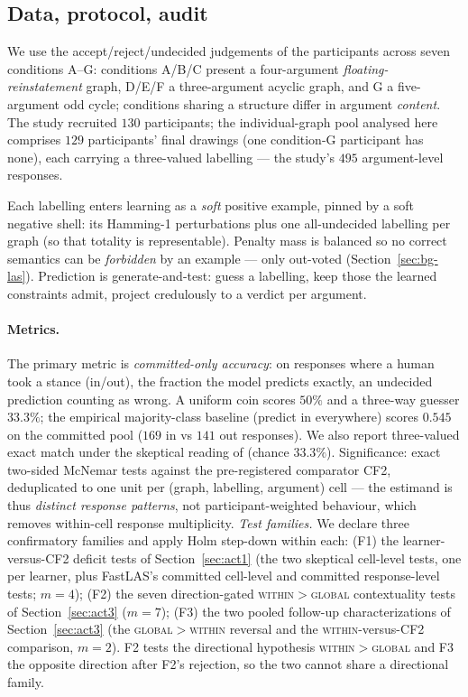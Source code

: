 \documentclass[review,12pt]{elsarticle}
\theoremstyle{definition}
\theoremstyle{remark}
\newcommand{\pred}[1]{\textsf{#1}}
\begin{document}
\subsection{Data, protocol, audit}
\label{sec:exp2setup}

We use the accept/reject/undecided judgements of the \citet{guillaume2022}
participants across seven conditions A--G: conditions A/B/C present a
four-argument \emph{floating-reinstatement} graph, D/E/F a three-argument
acyclic graph, and G a five-argument odd cycle; conditions sharing a structure
differ in argument \emph{content}. The study recruited $130$ participants; the
individual-graph pool analysed here comprises $129$ participants' final
drawings (one condition-G participant has none), each carrying a three-valued
labelling --- the study's $495$ argument-level responses.

Each labelling enters learning as a \emph{soft} positive example, pinned by a
soft negative shell: its Hamming-1 perturbations plus one all-undecided
labelling per graph (so that totality is representable). Penalty mass is
balanced so no correct semantics can be \emph{forbidden} by an example --- only
out-voted (Section~\ref{sec:bg-las}). Prediction is generate-and-test: guess a
labelling, keep those the learned constraints admit, project credulously to a
verdict per argument.

\paragraph{Metrics.} The primary metric is \emph{committed-only accuracy}: on
responses where a human took a stance (\pred{in}/\pred{out}), the fraction the
model predicts exactly, an undecided prediction counting as wrong. A uniform
coin scores $50\%$ and a three-way guesser $33.3\%$; the empirical
majority-class baseline (predict \pred{in} everywhere) scores $0.545$ on the
committed pool ($169$ \pred{in} vs $141$ \pred{out} responses). We also report
three-valued exact match under the skeptical reading of \citet{guillaume2022}
(chance $33.3\%$). Significance: exact two-sided McNemar tests against the
pre-registered comparator CF2, deduplicated to one unit per (graph, labelling,
argument) cell --- the estimand is thus \emph{distinct response patterns}, not
participant-weighted behaviour, which removes within-cell response
multiplicity. \emph{Test families.} We declare three confirmatory families
and apply Holm step-down within each: (F1) the learner-versus-CF2 deficit
tests of Section~\ref{sec:act1} (the two skeptical cell-level tests, one per
learner, plus FastLAS's committed cell-level and committed response-level
tests; $m=4$); (F2) the seven
direction-gated \textsc{within}${}>{}$\textsc{global} contextuality tests of
Section~\ref{sec:act3} ($m=7$); (F3) the two pooled
follow-up characterizations of Section~\ref{sec:act3} (the
\textsc{global}${}>{}$\textsc{within} reversal and the
\textsc{within}-versus-CF2 comparison, $m=2$). F2 tests the directional
hypothesis \textsc{within}${}>{}$\textsc{global} and F3 the opposite
direction after F2's rejection, so the two cannot share a directional family.
\end{document}
